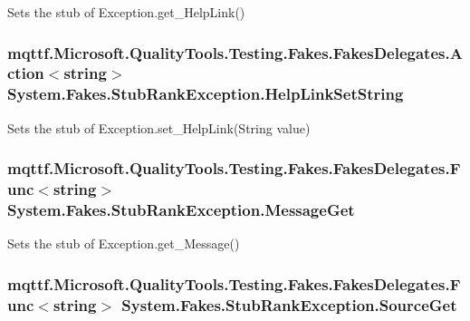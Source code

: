 Sets the stub of Exception.\-get\-\_\-\-Help\-Link()

\hypertarget{class_system_1_1_fakes_1_1_stub_rank_exception_a82f6d0e5ae78b9f237daf2653c997922}{
\subsubsection[{Help\-Link\-Set\-String}]{\setlength{\rightskip}{0pt plus 5cm}mqttf.\-Microsoft.\-Quality\-Tools.\-Testing.\-Fakes.\-Fakes\-Delegates.\-Action$<$string$>$ System.\-Fakes.\-Stub\-Rank\-Exception.\-Help\-Link\-Set\-String}}\label{class_system_1_1_fakes_1_1_stub_rank_exception_a82f6d0e5ae78b9f237daf2653c997922}


Sets the stub of Exception.\-set\-\_\-\-Help\-Link(\-String value)

\hypertarget{class_system_1_1_fakes_1_1_stub_rank_exception_a5a32fb786590c0ac82d951df5e63bc52}{
\subsubsection[{Message\-Get}]{\setlength{\rightskip}{0pt plus 5cm}mqttf.\-Microsoft.\-Quality\-Tools.\-Testing.\-Fakes.\-Fakes\-Delegates.\-Func$<$string$>$ System.\-Fakes.\-Stub\-Rank\-Exception.\-Message\-Get}}\label{class_system_1_1_fakes_1_1_stub_rank_exception_a5a32fb786590c0ac82d951df5e63bc52}


Sets the stub of Exception.\-get\-\_\-\-Message()

\hypertarget{class_system_1_1_fakes_1_1_stub_rank_exception_a9da9149b4200cfbdfc94fa40d83e4b63}{
\subsubsection[{Source\-Get}]{\setlength{\rightskip}{0pt plus 5cm}mqttf.\-Microsoft.\-Quality\-Tools.\-Testing.\-Fakes.\-Fakes\-Delegates.\-Func$<$string$>$ System.\-Fakes.\-Stub\-Rank\-Exception.\-Source\-Get}}\label{class_system_1_1_fakes_1_1_stub_rank_exception_a9da9149b4200cfbdfc94fa40d83e4b63}


